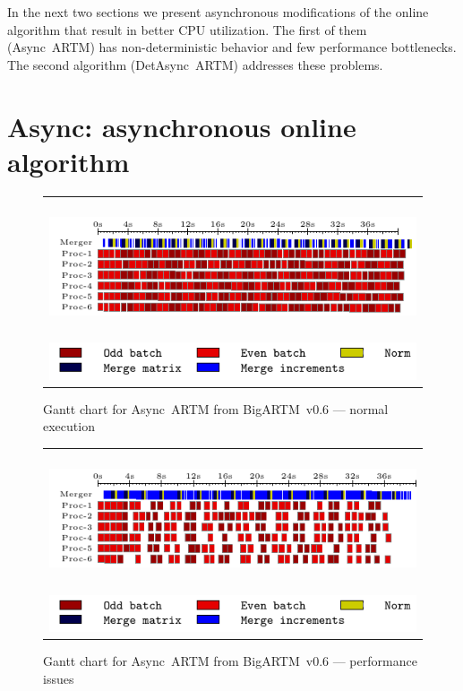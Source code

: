 \documentclass[russian,english]{llncs}
\newcommand{\kw}[1]{\mbox{\textsf{#1}}}
\begin{document}
In the next two sections we present asynchronous modifications of the online algorithm that result in better CPU utilization.
The first of them (\kw{Async~ARTM}) has non-deterministic behavior and few performance bottlenecks.
The second algorithm (\kw{DetAsync~ARTM}) addresses these problems.

\section{Async: asynchronous online algorithm}
\label{sec:AsyncARTM}

\begin{figure}[h]
	\centering
	\begin{tabular}{c}
		\includegraphics[height=4cm, width=12cm]{plots/old.pdf} \\
		\includegraphics[scale=1]{plots/legend_old.pdf}
	\end{tabular}
	\caption{Gantt chart for \kw{Async ARTM} from \kw{BigARTM v0.6} --- normal execution} \label{fig:gantt:AsyncARTM}
\end{figure}

\begin{figure}[h]
	\centering
	\begin{tabular}{c}
		\includegraphics[height=4cm, width=12cm]{plots/old_slow.pdf} \\
		\includegraphics[scale=1]{plots/legend_old.pdf}
	\end{tabular}
	\caption{Gantt chart for \kw{Async ARTM} from \kw{BigARTM v0.6} --- performance issues} \label{fig:gantt:AsyncARTM:slow}
\end{figure}
\end{document}
